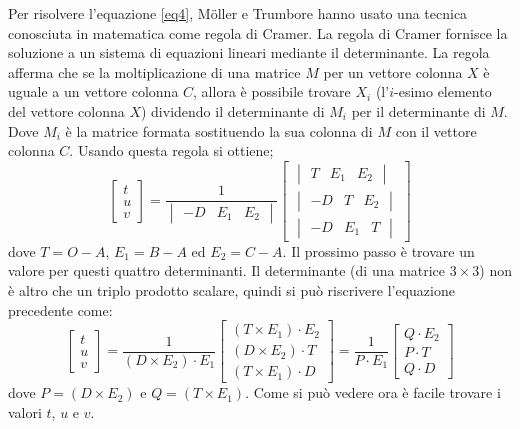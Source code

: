 Per risolvere l'equazione \ref{eq4}, M\"oller e Trumbore hanno usato una tecnica conosciuta in matematica come regola di Cramer. La regola di Cramer fornisce la soluzione a un sistema di equazioni lineari mediante il determinante. La regola afferma che se la moltiplicazione di una matrice $M$ per un vettore colonna $X$ è uguale a un vettore colonna $C$, allora è possibile trovare $X_i$ (l'$i$-esimo elemento del vettore colonna $X$) dividendo il determinante di $M_i$ per il determinante di $M$. Dove $M_i$ è la matrice formata sostituendo la sua colonna di $M$ con il vettore colonna $C$. Usando questa regola si ottiene;
\begin{equation}
\begin{bmatrix}
t \\
u \\
v
\end{bmatrix} = 
\frac{1}{\begin{vmatrix}-D & E_1 & E_2\end{vmatrix}}
\begin{bmatrix}
\begin{vmatrix}T & E_1 & E_2\end{vmatrix} \\
\begin{vmatrix}-D & T & E_2\end{vmatrix} \\
\begin{vmatrix}-D & E_1 & T\end{vmatrix}
\end{bmatrix}
\label{eq5}
\end{equation}
dove $T=O-A$, $E_1=B-A$ ed $E_2=C-A$. Il prossimo passo è trovare un valore per questi quattro determinanti. Il determinante (di una matrice $3 \times 3$) non è altro che un triplo prodotto scalare, quindi si può riscrivere l'equazione precedente come:
\begin{equation}
\begin{bmatrix}
t \\
u \\
v
\end{bmatrix} 
= \frac{1}{(D \times E_2) \cdot E_1}
\begin{bmatrix}
(T \times E_1) \cdot E_2 \\
(D \times E_2) \cdot T \\
(T \times E_1) \cdot D
\end{bmatrix}
= \frac{1}{P \cdot E_1}
\begin{bmatrix}
Q \cdot E_2 \\
P \cdot T \\
Q \cdot D
\end{bmatrix}
\end{equation}
dove $P = (D \times E_2)$ e $Q = (T \times E_1)$. Come si può vedere ora è facile trovare i valori $t$, $u$ e $v$.


